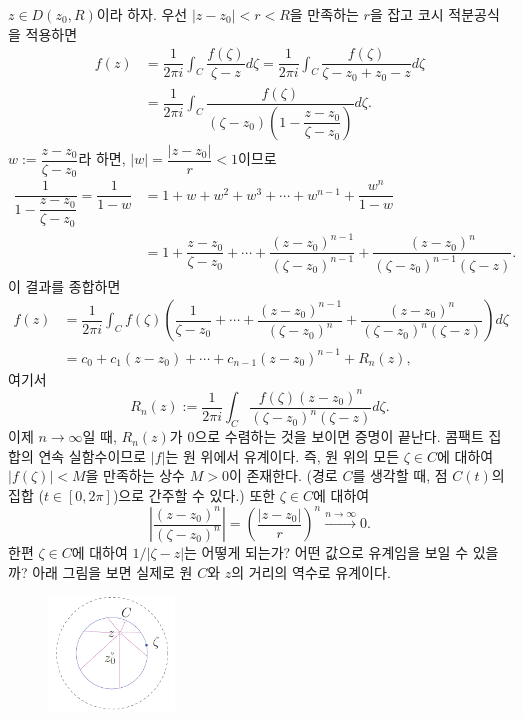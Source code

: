 $z\in D(z_0, R)$이라 하자.
우선 $|z-z_0|<r<R$을 만족하는 $r$을 잡고
코시 적분공식을 적용하면
\begin{align*}
f(z) &= \dfrac1{2\pi i}\int_C \dfrac{f(\zeta)}{\zeta-z} d\zeta
= \dfrac1{2\pi i}\int_C \dfrac{f(\zeta)}{\zeta-z_0+z_0-z} d\zeta \\
&= \dfrac1{2\pi i}\int_C \dfrac{f(\zeta)}{(\zeta-z_0)\left(1- \dfrac{z-z_0}{\zeta-z_0}\right)} d\zeta.
\end{align*}
$w:=\dfrac{z-z_0}{\zeta-z_0}$라 하면,
$|w| = \dfrac{|z-z_0|}r <1$이므로
\begin{align*}
\dfrac1{1-\dfrac{z-z_0}{\zeta-z_0}} = \dfrac1{1-w}
& = 1+ w + w^2 + w^3 + \cdots + w^{n-1} + \dfrac{w^n}{1-w} \\
&= 1 + \dfrac{z-z_0}{\zeta-z_0} + \cdots + \dfrac{(z-z_0)^{n-1}}{(\zeta-z_0)^{n-1}}
+ \dfrac{(z-z_0)^n}{(\zeta-z_0)^{n-1}(\zeta-z)}.
\end{align*}
이 결과를 종합하면
\begin{align*}
f(z) &= \dfrac1{2\pi i}\int_C f(\zeta) \left(
\dfrac1{\zeta-z_0} + \cdots + \dfrac{(z-z_0)^{n-1}}{(\zeta-z_0)^{n}}
+ \dfrac{(z-z_0)^n}{(\zeta-z_0)^{n}(\zeta-z)} \right) d\zeta \\
&= c_0 + c_1(z-z_0) + \cdots + c_{n-1}(z-z_0)^{n-1} + R_n(z),
\end{align*}
여기서 
\[
R_n(z) := \dfrac1{2\pi i} \int_C \dfrac{f(\zeta)(z-z_0)^n}{(\zeta-z_0)^n(\zeta-z)}d\zeta.
\]
이제 $n\to\infty$일 때, $R_n(z)$가 $0$으로 수렴하는 것을 보이면 증명이 끝난다.
콤팩트 집합의 연속 실함수이므로 $|f|$는 원 위에서 유계이다.
즉, 원 위의 모든 $\zeta\in C$에 대하여 $|f(\zeta)|<M$을 만족하는 상수 $M>0$이 존재한다.
(경로 $C$를 생각할 때, 점 $C(t)$의 집합 ($t\in [0,2\pi]$)으로 간주할 수 있다.)
또한 $\zeta\in C$에 대하여
\[
\left| \dfrac{(z-z_0)^n}{(\zeta-z_0)^n}\right| 
= \left( \dfrac{|z-z_0|}r \right)^n
\xrightarrow{n\to\infty}0.
\]
한편 $\zeta\in C$에 대하여 $1/|\zeta-z|$는 어떻게 되는가?
어떤 값으로 유계임을 보일 수 있을까?
아래 그림을 보면 실제로 원 $C$와  $z$의 거리의 역수로 유계이다.

\begin{figure}[h!]
\begin{center}
\includegraphics[width=0.3\textwidth]{./SaltChapter/figs/fig-4-0-5}
\end{center}
\end{figure}

